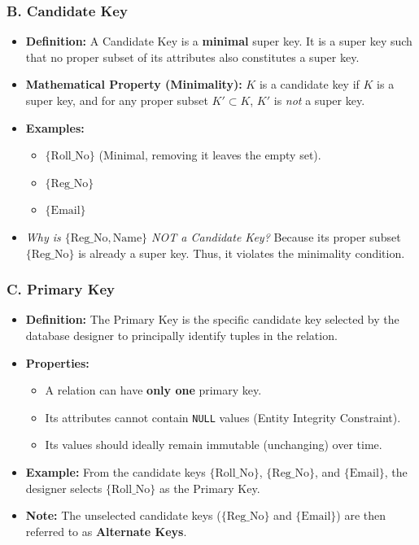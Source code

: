 \documentclass[12pt,a3paper]{article}
\begin{document}
\begin{enumerate}
\begin{tcolorbox}[enhanced,breakable,ansbox,colback=cA!4,colframe=cA,boxrule=0.8pt,arc=5pt,title={\textbf{Answer}},fonttitle=\bfseries\color{white},colbacktitle=cA]
\subsubsection*{B. Candidate Key}
\begin{itemize}
    \item \textbf{Definition:} A Candidate Key is a \textbf{minimal} super key. It is a super key such that no proper subset of its attributes also constitutes a super key.
    \item \textbf{Mathematical Property (Minimality):} $K$ is a candidate key if $K$ is a super key, and for any proper subset $K' \subset K$, $K'$ is \textit{not} a super key.
    \item \textbf{Examples:} 
    \begin{itemize}
        \item $\{\text{Roll\_No}\}$ (Minimal, removing it leaves the empty set).
        \item $\{\text{Reg\_No}\}$ 
        \item $\{\text{Email}\}$
    \end{itemize}
    \item \textit{Why is $\{\text{Reg\_No}, \text{Name}\}$ NOT a Candidate Key?} Because its proper subset $\{\text{Reg\_No}\}$ is already a super key. Thus, it violates the minimality condition.
\end{itemize}

\subsubsection*{C. Primary Key}
\begin{itemize}
    \item \textbf{Definition:} The Primary Key is the specific candidate key selected by the database designer to principally identify tuples in the relation.
    \item \textbf{Properties:} 
    \begin{itemize}
        \item A relation can have \textbf{only one} primary key.
        \item Its attributes cannot contain \texttt{NULL} values (Entity Integrity Constraint).
        \item Its values should ideally remain immutable (unchanging) over time.
    \end{itemize}
    \item \textbf{Example:} From the candidate keys $\{\text{Roll\_No}\}$, $\{\text{Reg\_No}\}$, and $\{\text{Email}\}$, the designer selects \textbf{$\{\text{Roll\_No}\}$} as the Primary Key. 
    \item \textbf{Note:} The unselected candidate keys ($\{\text{Reg\_No}\}$ and $\{\text{Email}\}$) are then referred to as \textbf{Alternate Keys}.
\end{itemize}


\end{tcolorbox}
\end{enumerate}
\end{document}
